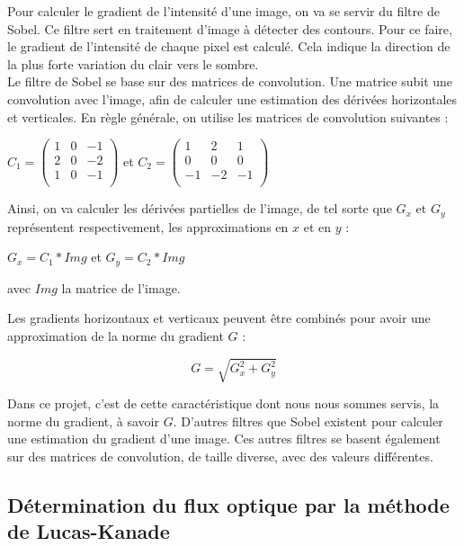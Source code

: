 Pour calculer le gradient de l'intensité d'une image, on va se servir du filtre de Sobel. Ce filtre sert en traitement d'image à détecter des contours. Pour ce faire, le gradient de l'intensité de chaque pixel est calculé. Cela indique la direction de la plus forte variation du clair vers le sombre.\\

Le filtre de Sobel se base sur des matrices de convolution. Une matrice subit une convolution avec l'image, afin de calculer une estimation des dérivées horizontales et verticales. En règle générale, on utilise les matrices de convolution suivantes :

\begin{center}
$
	C_1 = \begin{pmatrix}
		1 & 0 & -1 \\
		2 & 0 & -2 \\
		1 & 0 & -1 \\
	\end{pmatrix}
$
 et 
$	
	C_2 = \begin{pmatrix}
		1 & 2 & 1 \\
		0 & 0 & 0 \\
		-1 & -2 & -1 \\
	\end{pmatrix}
$
\end{center}

Ainsi, on va calculer les dérivées partielles de l'image, de tel sorte que $G_x$ et $G_y$ représentent respectivement, les approximations en $x$ et en $y$ :

\begin{center}
$
	G_x = C_1 \ast Img
$
 et 
$	
	G_y = C_2 \ast Img
$
\end{center}
avec $Img$ la matrice de l'image.

Les gradients horizontaux et verticaux peuvent être combinés pour avoir une approximation de la norme du gradient $G$ : 

\[
	G = \sqrt{G_x^2 + G_y^2}
\]

Dans ce projet, c'est de cette caractéristique dont nous nous sommes servis, la norme du gradient, à savoir $G$. D'autres filtres que Sobel existent pour calculer une estimation du gradient d'une image. Ces autres filtres se basent également sur des matrices de convolution, de taille diverse, avec des valeurs différentes.

\subsection{Détermination du flux optique par la méthode de Lucas-Kanade}

